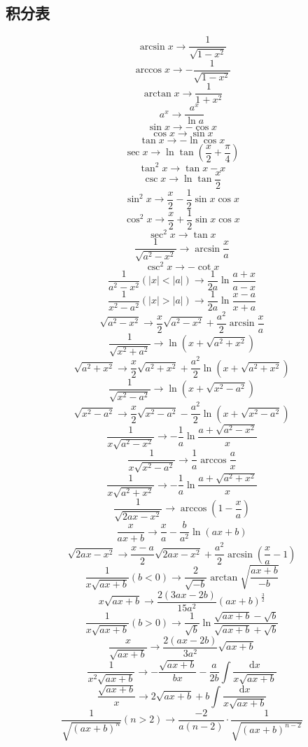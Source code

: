 \documentclass{article}
\begin{document}
\subsection{积分表}

\[\arcsin x \to \frac{1}{\sqrt{1-x^2}}                   \]
\[\arccos x \to -\frac{1}{\sqrt{1-x^2}}                  \]
\[\arctan x \to \frac{1}{1+x^2}                          \]
\[a^x \to \frac{a^x}{\ln a}                              \]
\[\sin x \to -\cos x                                     \]
\[\cos x \to \sin x                                      \]
\[\tan x \to -\ln\cos x                                  \]
\[\sec x \to \ln\tan(\frac{x}{2}+\frac{\pi}{4})          \]
\[\tan^2 x \to \tan x - x                                \]
\[\csc x \to \ln\tan\frac{x}{2}                          \]
\[\sin^2 x \to \frac{x}{2} - \frac{1}{2}\sin x\cos x     \]
\[\cos^2 x \to \frac{x}{2} + \frac{1}{2}\sin x\cos x     \]
\[\sec^2 x \to \tan x                                    \]
\[\frac{1}{\sqrt{a^2-x^2}} \to \arcsin\frac{x}{a}        \]
\[\csc^2 x \to -\cot x                                   \]
\[\frac{1}{a^2-x^2}(|x|<|a|) \to \frac{1}{2a}\ln\frac{a+x}{a-x}  \]
\[\frac{1}{x^2-a^2}(|x|>|a|) \to \frac{1}{2a}\ln\frac{x-a}{x+a}  \]
\[\sqrt{a^2-x^2} \to \frac{x}{2}\sqrt{a^2-x^2}+\frac{a^2}{2}\arcsin\frac{x}{a}   \]
\[\frac{1}{\sqrt{x^2+a^2}} \to \ln(x+\sqrt{a^2+x^2}) \]
\[\sqrt{a^2+x^2} \to \frac{x}{2}\sqrt{a^2+x^2}+\frac{a^2}{2}\ln(x+\sqrt{a^2+x^2})\]
\[\frac{1}{\sqrt{x^2-a^2}} \to \ln(x+\sqrt{x^2-a^2})\]
\[\sqrt{x^2-a^2} \to \frac{x}{2}\sqrt{x^2-a^2}-\frac{a^2}{2}\ln(x+\sqrt{x^2-a^2})\]
\[\frac{1}{x\sqrt{a^2-x^2}} \to -\frac{1}{a}\ln\frac{a+\sqrt{a^2-x^2}}{x}\]
\[\frac{1}{x\sqrt{x^2-a^2}} \to \frac{1}{a}\arccos\frac{a}{x}\]
\[\frac{1}{x\sqrt{a^2+x^2}} \to -\frac{1}{a}\ln\frac{a+\sqrt{a^2+x^2}}{x}\]
\[\frac{1}{\sqrt{2ax-x^2}} \to \arccos(1-\frac{x}{a})\]
\[\frac{x}{ax+b} \to \frac{x}{a}-\frac{b}{a^2}\ln(ax+b)\]
\[\sqrt{2ax-x^2} \to \frac{x-a}{2}\sqrt{2ax-x^2}+\frac{a^2}{2}\arcsin(\frac{x}{a}-1)\]
\[\frac{1}{x\sqrt{ax+b}}(b<0) \to \frac{2}{\sqrt{-b}}\arctan\sqrt{\frac{ax+b}{-b}}\]
\[x\sqrt{ax+b} \to \frac{2(3ax-2b)}{15a^2}(ax+b)^{\frac{3}{2}}\]
\[\frac{1}{x\sqrt{ax+b}}(b>0) \to \frac{1}{\sqrt{b}}\ln\frac{\sqrt{ax+b}-\sqrt{b}}{\sqrt{ax+b}+\sqrt{b}}\]
\[\frac{x}{\sqrt{ax+b}} \to \frac{2(ax-2b)}{3a^2}\sqrt{ax+b}\]
\newcommand{\ud}{\mathrm{d}}
\[\frac{1}{x^2 \sqrt{ax+b}} \to -\frac{\sqrt{ax+b}}{bx}-\frac{a}{2b}\int\frac{\ud x}{x\sqrt{ax+b}}\]
\[\frac{\sqrt{ax+b}}{x} \to 2\sqrt{ax+b}+b\int\frac{\ud x}{x\sqrt{ax+b}}\]
\[\frac{1}{\sqrt{(ax+b)^n}}(n>2) \to \frac{-2}{a(n-2)}\cdot\frac{1}{\sqrt{(ax+b)^{n-2}}}\]
\end{document}
